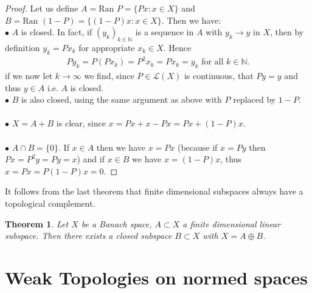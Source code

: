 \documentclass[11pt,a4paper]{article}
\newtheorem{thm}{Theorem}[section]
\theoremstyle{definition}
\begin{document}
\begin{proof}
Let us define $A= \text{Ran } P = \lbrace Px: x \in X\rbrace$ and $B= \text{Ran } (1-P)= \lbrace (1-P)x: x \in X \rbrace$. Then we have:
\\
$\bullet$ $A$ is closed. In fact, if $(y_k)_{k \in \mathbb{N}}$ is a sequence in $A$ with $y_k \to y$ in $X$, then by definition $y_k = P{x_k}$ for appropriate $x_k \in X$. Hence
\begin{align*}
Py_k = P(P{x_k})=P^2x_k = Px_k = y_k \text{ for all } k \in \mathbb{N}.
\end{align*}
if we now let $k \to \infty$ we find, since $P \in \mathcal{L}(X)$ is continuous, that $Py=y$ and thus $y \in A$ i.e. $A$ is closed. 
\\
$\bullet$ $B$ is also closed, using the same argument as above with $P$ replaced by $1-P$. 
\\\\
$\bullet$ $X=A+B$ is clear, since $x=Px + x -Px = Px + (1-P)x$.
\\\\
$\bullet$ $A \cap B = \lbrace 0 \rbrace$. If $x \in A$ then we have $x=Px$ (because if $x=Py$ then $Px=P^2y=Py=x$) and if $x \in B$ we have $x=(1-P)x$, thus $x=Px=P(1-P)x=0$. 
\end{proof}
\newpage
It follows from the last theorem that finite dimensional subspaces always have a topological complement.
\begin{thm} Let $X$ be a Banach space, $A \subset X$ a finite dimensional linear subspace. Then there exists a closed subspace $B \subset X$ with $X = A \oplus B$. 
\end{thm}
\section{Weak Topologies on normed spaces}
\end{document}
